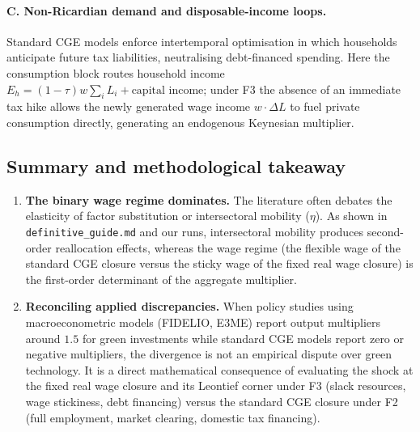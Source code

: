 \paragraph{C. Non-Ricardian demand and disposable-income loops.} Standard CGE
models enforce intertemporal optimisation in which households anticipate
future tax liabilities, neutralising debt-financed spending. Here the
consumption block routes household income $E_h = (1-\tau) w \sum_i L_i +
\text{capital income}$; under F3 the absence of an immediate tax hike allows
the newly generated wage income $w\cdot\Delta L$ to fuel private consumption
directly, generating an endogenous Keynesian multiplier.

\subsection{Summary and methodological takeaway}\label{app:summary}

\begin{enumerate}
\item \textbf{The binary wage regime dominates.} The literature often debates
  the elasticity of factor substitution or intersectoral mobility ($\eta$).
  As shown in \texttt{definitive\_guide.md} and our runs, intersectoral
  mobility produces second-order reallocation effects, whereas the wage regime
  (the flexible wage of the standard CGE closure versus the sticky wage of the
  fixed real wage closure) is the first-order determinant of the
  aggregate multiplier.
\item \textbf{Reconciling applied discrepancies.} When policy studies using
  macroeconometric models (FIDELIO, E3ME) report output multipliers around
  $1.5$ for green investments while standard CGE models report zero or
  negative multipliers, the divergence is not an empirical dispute over green
  technology. It is a direct mathematical consequence of evaluating the shock
  at the fixed real wage closure and its Leontief corner under F3 (slack
  resources, wage stickiness, debt financing) versus
  the standard CGE closure under F2 (full employment, market clearing,
  domestic tax financing).
\end{enumerate}
